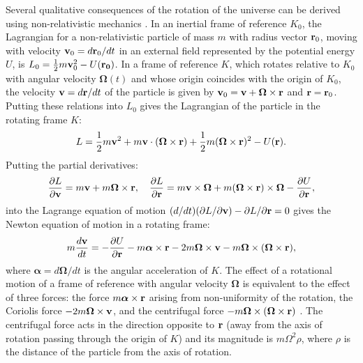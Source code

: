 \documentclass[prd,onecolumn,nofootinbib]{revtex4}
\begin{document}
Several qualitative consequences of the rotation of the universe can be derived using non-relativistic mechanics \cite{LL1}.
In an inertial frame of reference $K_0$, the Lagrangian for a non-relativistic particle of mass $m$ with radius vector ${\bf r}_0$, moving with velocity ${\bf v}_0=d{\bf r}_0/dt$ in an external field represented by the potential energy $U$, is $L_0=\frac{1}{2}m{\bf v}^2_0-U({\bf r_0})$.
In a frame of reference $K$, which rotates relative to $K_0$ with angular velocity ${\bm\Omega}(t)$ and whose origin coincides with the origin of $K_0$, the velocity ${\bf v}=d{\bf r}/dt$ of the particle is given by ${\bf v}_0={\bf v}+{\bm\Omega}\times{\bf r}$ and ${\bf r}={\bf r}_0$.
Putting these relations into $L_0$ gives the Lagrangian of the particle in the rotating frame $K$:
\begin{equation}
L=\frac{1}{2}m{\bf v}^2+m{\bf v}\cdot({\bm\Omega}\times{\bf r})+\frac{1}{2}m({\bm\Omega}\times{\bf r})^2-U({\bf r}).
\end{equation}
Putting the partial derivatives:
\begin{equation}
\frac{\partial L}{\partial{\bf v}}=m{\bf v}+m{\bm\Omega}\times{\bf r},\quad \frac{\partial L}{\partial{\bf r}}=m{\bf v}\times{\bm\Omega}+m({\bm\Omega}\times{\bf r})\times{\bm\Omega}-\frac{\partial U}{\partial{\bf r}},
\end{equation}
into the Lagrange equation of motion $(d/dt)(\partial L/\partial{\bf v})-\partial L/\partial{\bf r}=0$ gives the Newton equation of motion in a rotating frame:
\begin{equation}
m\frac{d{\bf v}}{dt}=-\frac{\partial U}{\partial{\bf r}}-m{\bm\alpha}\times{\bf r}-2m{\bm\Omega}\times{\bf v}-m{\bm\Omega}\times({\bm\Omega}\times{\bf r}),
\end{equation}
where ${\bm\alpha}=d{\bm\Omega}/dt$ is the angular acceleration of $K$.
The effect of a rotational motion of a frame of reference with angular velocity ${\bm\Omega}$ is equivalent to the effect of three forces: the force $m{\bm\alpha}\times{\bf r}$ arising from non-uniformity of the rotation, the Coriolis force $-2m{\bm\Omega}\times{\bf v}$, and the centrifugal force $-m{\bm\Omega}\times({\bm\Omega}\times{\bf r})$ \cite{LL1}.
The centrifugal force acts in the direction opposite to ${\bf r}$ (away from the axis of rotation passing through the origin of $K$) and its magnitude is $m\Omega^2\rho$, where $\rho$ is the distance of the particle from the axis of rotation.
\end{document}
